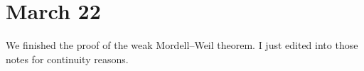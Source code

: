 \documentclass[../notes.tex]{subfiles}
\begin{document}
\section{March 22}

We finished the proof of the weak Mordell--Weil theorem. I just edited into those notes for continuity reasons.
\end{document}
